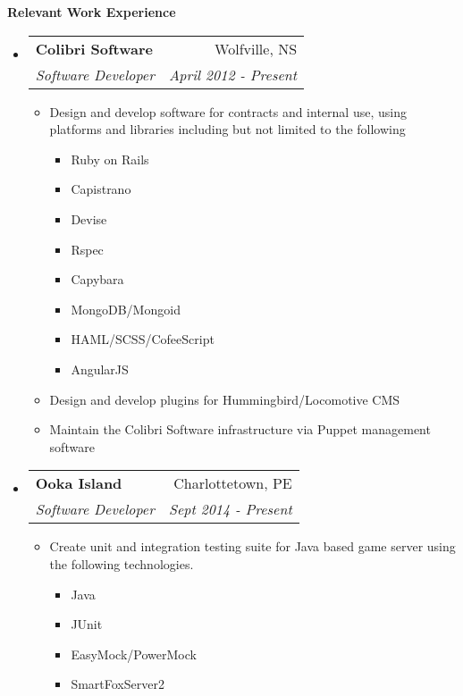 \documentclass[letterpaper,11pt]{article}
\makeatletter
\newcommand{\resitem}[1]{\item #1 \vspace{-2pt}}
\newcommand{\resheading}[1]{{\large \colorbox{mygrey}{\begin{minipage}{\textwidth}{\textbf{#1 \vphantom{p\^{E}} }}\end{minipage}} }}
\newcommand{\ressubheading}[4]{
\begin{tabular*}{6.5in}{l@{\extracolsep{\fill}}r}
        \textbf{#1} & #2 \\
        \textit{#3} & \textit{#4} \\
\end{tabular*}\vspace{-6pt}}
\makeatother
\begin{document}
\newpage
\mywebheader
\resheading{Relevant Work Experience} %
    \begin{itemize}
        \item[]
            \ressubheading{Colibri Software}{Wolfville, NS}{Software Developer}{April 2012 - Present}
                \begin{itemize}
                    \resitem{Design and develop software for contracts and internal use, using platforms and libraries including but not limited to the following}
                    \begin{itemize}
                      \resitem{Ruby on Rails}
                      \resitem{Capistrano}
                      \resitem{Devise}
                      \resitem{Rspec}
                      \resitem{Capybara}
                      \resitem{MongoDB/Mongoid}
                      \resitem{HAML/SCSS/CofeeScript}
                      \resitem{AngularJS}
                    \end{itemize}
                    \resitem{Design and develop plugins for Hummingbird/Locomotive CMS}
                    \resitem{Maintain the Colibri Software infrastructure via Puppet management software}
                \end{itemize}
        \item[]
            \ressubheading{Ooka Island}{Charlottetown, PE}{Software Developer}{Sept 2014 - Present}
                \begin{itemize}
                    \resitem{Create unit and integration testing suite for Java based game server using the following technologies.}
                    \begin{itemize}
                      \resitem{Java}
                      \resitem{JUnit}
                      \resitem{EasyMock/PowerMock}
                      \resitem{SmartFoxServer2}
                    \end{itemize}
                \end{itemize}
\begin{comment}
        \item[]
            \ressubheading{76 Minas Sea Cadets (DND)}{Windsor, NS}{Administration Officer}{Sept. 2014 - Present}
                \begin{itemize}
                    \resitem{Employed organization skills in maintaining online database of cadet documentation to ensure easy and consistent transfer of data
                    between units and headquarters}
                    \resitem{Create and maintain paper documentation on every cadet to enter the unit}

\end{comment}
\end{itemize}
\end{document}

